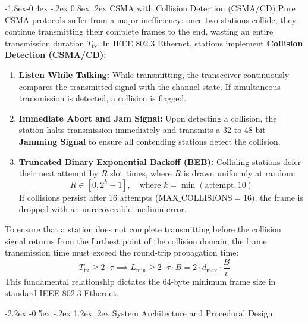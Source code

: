 \documentclass[11pt,a4paper]{article}
\makeatletter
\renewcommand\section{\@startsection {section}{1}{\z@}%
                                   {-2.2ex \@plus -0.5ex \@minus -.2ex}%
                                   {1.2ex \@plus.2ex}%
                                   {\normalfont\Large\bfseries}}
\renewcommand\subsection{\@startsection{subsection}{2}{\z@}%
                                     {-1.8ex\@plus -0.4ex \@minus -.2ex}%
                                     {0.8ex \@plus .2ex}%
                                     {\normalfont\large\bfseries}}
\makeatother
\begin{document}
\subsection{CSMA with Collision Detection (CSMA/CD)}
Pure CSMA protocols suffer from a major inefficiency: once two stations collide, they continue transmitting their complete frames to the end, wasting an entire transmission duration $T_{\text{tx}}$. In IEEE 802.3 Ethernet, stations implement \textbf{Collision Detection (CSMA/CD)}:
\begin{enumerate}
    \item \textbf{Listen While Talking:} While transmitting, the transceiver continuously compares the transmitted signal with the channel state. If simultaneous transmission is detected, a collision is flagged.
    \item \textbf{Immediate Abort and Jam Signal:} Upon detecting a collision, the station halts transmission immediately and transmits a 32-to-48 bit \textbf{Jamming Signal} to ensure all contending stations detect the collision.
    \item \textbf{Truncated Binary Exponential Backoff (BEB):} Colliding stations defer their next attempt by $R$ slot times, where $R$ is drawn uniformly at random:
    \begin{equation}
        R \in [0, 2^k - 1], \quad \text{where } k = \min(\text{attempt}, 10)
    \end{equation}
    If collisions persist after 16 attempts ($\text{MAX\_COLLISIONS} = 16$), the frame is dropped with an unrecoverable medium error.
\end{enumerate}

To ensure that a station does not complete transmitting before the collision signal returns from the furthest point of the collision domain, the frame transmission time must exceed the round-trip propagation time:
\begin{equation}
    T_{\text{tx}} \ge 2 \cdot \tau \implies L_{\text{min}} \ge 2 \cdot \tau \cdot B = 2 \cdot d_{\text{max}} \cdot \frac{B}{v}
\end{equation}
This fundamental relationship dictates the 64-byte minimum frame size in standard IEEE 802.3 Ethernet.

\section{System Architecture and Procedural Design}
\end{document}

